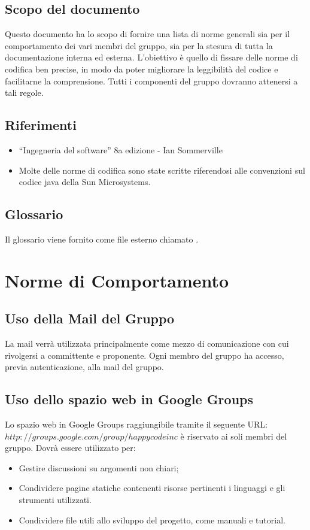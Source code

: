 \documentclass[11pt,titlepage,a4paper]{report}
\begin{document}
\section{Scopo del documento}
Questo documento ha lo scopo di fornire una lista di norme generali sia per il comportamento dei vari membri del gruppo, sia per la stesura di tutta la documentazione interna ed esterna. L'obiettivo \`e quello di fissare delle norme di codifica ben precise, in modo da poter migliorare la leggibilit\`a del codice e facilitarne la comprensione. Tutti i componenti del gruppo dovranno attenersi a tali regole.
\section{Riferimenti}
\begin{itemize}
\item ``Ingegneria del software'' 8a edizione - Ian Sommerville 
\item Molte delle norme di codifica sono state scritte riferendosi alle convenzioni sul codice java della Sun Microsystems.
\end{itemize}
\section{Glossario}
Il glossario viene fornito come file esterno chiamato \Glossario .

\chapter{Norme di Comportamento}
\section{Uso della Mail del Gruppo}
La mail verr\`a utilizzata principalmente come mezzo di comunicazione con cui rivolgersi a committente e proponente. Ogni membro del gruppo ha accesso, previa autenticazione, alla mail del gruppo.
\section{Uso dello spazio web in Google Groups}
Lo spazio web in Google Groups raggiungibile tramite il seguente URL: \({http://groups.google.com/group/happycodeinc}\) \`e riservato ai soli membri del gruppo. Dovr\`a essere utilizzato per:
\begin{itemize}
\item  Gestire discussioni su argomenti non chiari;
\item Condividere pagine statiche contenenti risorse pertinenti i linguaggi e gli strumenti utilizzati.
\item Condividere file utili allo sviluppo del progetto, come manuali e tutorial.
\end{itemize}
\end{document}
